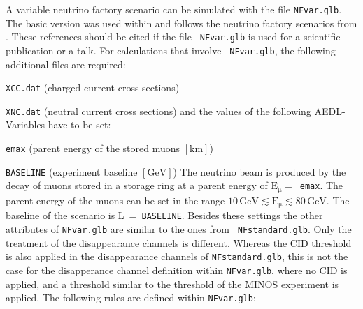 A variable neutrino factory scenario can be simulated with the file {\tt NFvar.glb}. The basic version was
used within \cite{Huber:2006wb} and follows the neutrino factory scenarios from \cite{Huber:2002mx}. These
references should be cited if the file {\tt
NFvar.glb} is used for a scientific publication or a talk. For calculations that involve {\tt
NFvar.glb}, the following additional files are required:
\bi
\item {\tt XCC.dat} (charged current cross sections)
\item {\tt XNC.dat} (neutral current cross sections)
\ei
and the values of the following {\sf AEDL}-Variables have to be set:
\bi
\item {\tt emax} (parent energy of the stored muons $\left[\mathrm{km}\right]$)
\item {\tt BASELINE} (experiment baseline $\left[\mathrm{GeV}\right]$)
\ei
The neutrino beam is produced by the decay of muons stored in a storage ring at a parent energy of
$\mathrm{E_\mu =}$~{\tt emax}. The parent energy of the muons can be set in the range
$\mathrm{10\,GeV\lesssim E_\mu\lesssim 80\, GeV}$. The baseline of the scenario is L~=~{\tt BASELINE}. 
Besides these settings the other attributes of {\tt NFvar.glb} are similar to the ones from {\tt
NFstandard.glb}. Only the treatment of the disappearance channels is different. Whereas the CID threshold is
also applied in the disappearance channels of {\tt NFstandard.glb}, this is not the case for the disapperance
channel definition within {\tt NFvar.glb}, where no CID is applied, and a threshold similar to the threshold of
the MINOS experiment \cite{Ables:1995wq} is applied. The following rules are defined within
{\tt NFvar.glb}:
